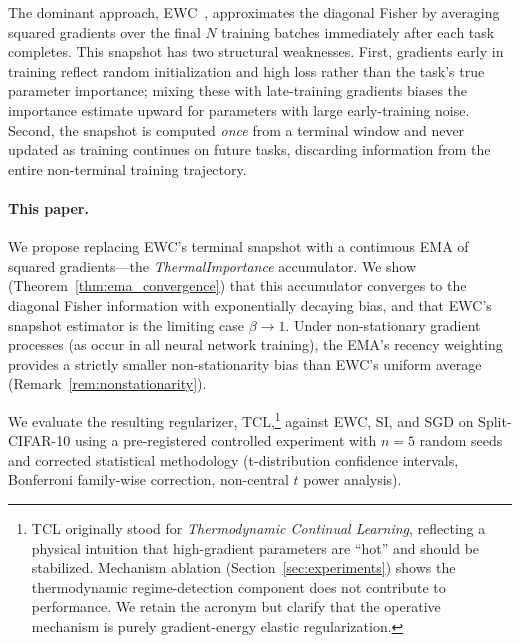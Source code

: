 \documentclass[10pt,letterpaper]{article}
\newcommand{\TCL}{\textsc{TCL}}
\newcommand{\EWC}{\textsc{EWC}}
\newcommand{\SI}{\textsc{SI}}
\newcommand{\SGD}{\textsc{SGD}}
\begin{document}
The dominant approach, \EWC{}~\cite{Kirkpatrick2017}, approximates the diagonal
Fisher by averaging squared gradients over the final $N$ training batches
immediately after each task completes.
This snapshot has two structural weaknesses.
First, gradients early in training reflect random initialization and high loss
rather than the task's true parameter importance; mixing these with late-training
gradients biases the importance estimate upward for parameters with large early-training
noise.
Second, the snapshot is computed \emph{once} from a terminal window and never
updated as training continues on future tasks, discarding information from the
entire non-terminal training trajectory.

\paragraph{This paper.}
We propose replacing \EWC{}'s terminal snapshot with a continuous EMA of
squared gradients---the \emph{ThermalImportance} accumulator.
We show (Theorem~\ref{thm:ema_convergence}) that this accumulator converges to
the diagonal Fisher information with exponentially decaying bias, and that
\EWC{}'s snapshot estimator is the limiting case $\beta \to 1$.
Under non-stationary gradient processes (as occur in all neural network training),
the EMA's recency weighting provides a strictly smaller non-stationarity bias
than \EWC{}'s uniform average (Remark~\ref{rem:nonstationarity}).

We evaluate the resulting regularizer, \TCL{},\footnote{%
  TCL originally stood for \emph{Thermodynamic Continual Learning}, reflecting a
  physical intuition that high-gradient parameters are ``hot'' and should be
  stabilized.  Mechanism ablation (Section~\ref{sec:experiments}) shows the
  thermodynamic regime-detection component does not contribute to performance.
  We retain the acronym but clarify that the operative mechanism is purely
  gradient-energy elastic regularization.}
against \EWC{}, \SI{}, and \SGD{} on Split-CIFAR-10 using a pre-registered
controlled experiment with $n{=}5$ random seeds and corrected statistical
methodology (t-distribution confidence intervals, Bonferroni family-wise
correction, non-central $t$ power analysis).
\end{document}
